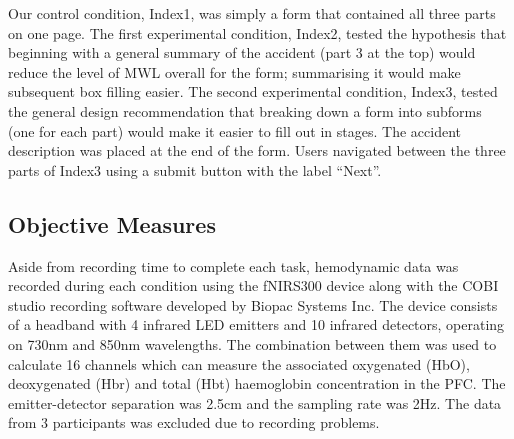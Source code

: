 \documentclass[../main/Feedback.tex]{subfiles}
\begin{document}
Our control condition, Index1, was simply a form that contained all three parts on one page.
The first experimental condition, Index2, tested the hypothesis that beginning with a general summary of the accident (part 3 at the top) would reduce the level of MWL overall for the form; summarising it would make subsequent box filling easier.
The second experimental condition, Index3, tested the general design recommendation that breaking down a form into subforms (one for each part) would make it easier to fill out in stages.
The accident description was placed at the end of the form. %
Users navigated between the three parts of Index3 using a submit button with the label ``Next''.



\subsection{Objective Measures}
Aside from recording time to complete each task, hemodynamic data was recorded during each condition using the fNIRS300 device along with the COBI studio recording software developed by Biopac Systems Inc.
The device consists of a headband with 4 infrared LED emitters and 10 infrared detectors, operating on 730nm and 850nm wavelengths.
The combination between them was used to calculate 16 channels which can measure the associated oxygenated (HbO), deoxygenated (Hbr) and total (Hbt) haemoglobin concentration in the PFC.
The emitter-detector separation was 2.5cm and the sampling rate was 2Hz.
The data from 3 participants was excluded due to recording problems.
\end{document}
